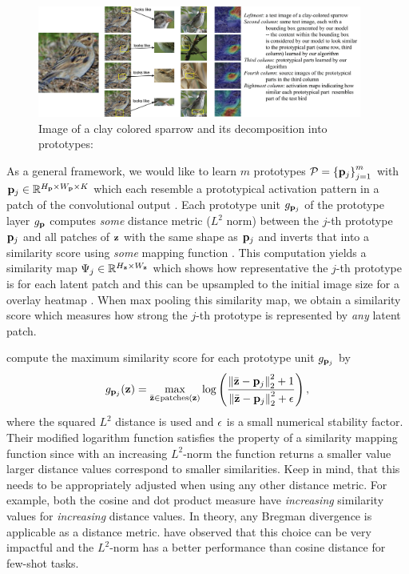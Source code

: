 \begin{figure}[h]
    \centering
    \includegraphics[width=0.95\textwidth]{Figures/Chapter3/introbird-1.png}
    \caption[Image of a clay colored sparrow and its decomposition into prototypes]{Image of a clay colored sparrow and its decomposition into prototypes: \citep{ChenLTBRS19}}
    \label{fig:looke_like}
\end{figure}
As a general framework, we would like to learn $m$ prototypes $\mathcal{P}=\left\{\mathbf{p}_{j}\right\}_{j=1}^{m}$ with $\mathbf{p}_{j} \in \mathbb{R}^{H_{\mathbf{p}} \times W_{\mathbf{p}} \times K}$ which each resemble a prototypical activation pattern in a patch of the convolutional output \citep{ChenLTBRS19}. Each prototype unit $g_{\mathbf{p}_{j}}$ of the prototype layer $g_{\mathbf{p}}$ computes \emph{some} distance metric (\eg $L^2$ norm) between the $j$-th prototype $\mathbf{p}_{j}$ and all patches of $\mathbf{z}$ with the same shape as $\mathbf{p}_{j}$ and inverts that into a similarity score using \emph{some} mapping function \citep{ChenLTBRS19}. This computation yields a similarity map $\Psi_j \in \mathbb{R}^{H_{\mathbf{z}} \times W_{\mathbf{z}}}$ which shows how representative the $j$-th prototype is for each latent patch and this can be upsampled to the initial image size for a overlay heatmap \citep{ChenLTBRS19}. When max pooling this similarity map, we obtain a similarity score which measures how strong the $j$-th prototype is represented by \emph{any} latent patch. 

\citet{ChenLTBRS19} compute the maximum similarity score for each prototype unit $g_{\mathbf{p}_{j}}$ by
\begin{equation}
    g_{\mathbf{p}_{j}}(\mathbf{z}) = \max_{\Bar{\mathbf{z}} \in \text{patches}(\mathbf{z})} \log \left( \frac{\left\|\Bar{\mathbf{z}} - \mathbf{p}_{j}\right\|^2_2 + 1}{\left\|\Bar{\mathbf{z}} - \mathbf{p}_{j}\right\|^2_2 + \epsilon} \right),
\end{equation}
where the squared $L^2$ distance is used and $\epsilon$ is a small numerical stability factor. Their modified logarithm function satisfies the property of a similarity mapping function since with an increasing $L^2$-norm the function returns a smaller value \ie larger distance values correspond to smaller similarities. Keep in mind, that this needs to be appropriately adjusted when using any other distance metric. For example, both the cosine and dot product measure have \emph{increasing} similarity values for \emph{increasing} distance values. In theory, any Bregman divergence \citep{BanerjeeMDG04} is applicable as a distance metric. \citet{SnellSZ17} have observed that this choice can be very impactful and the $L^2$-norm has a better performance than cosine distance for few-shot tasks. 

